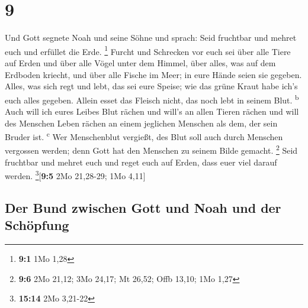 \hypertarget{section-8}{%
\section{9}\label{section-8}}

 Und Gott segnete Noah und seine Söhne und sprach: Seid
fruchtbar und mehret euch und erfüllet die Erde. \footnote{\textbf{9:1}
  1Mo 1,28}  Furcht und Schrecken vor euch sei über alle
Tiere auf Erden und über alle Vögel unter dem Himmel, über alles, was
auf dem Erdboden kriecht, und über alle Fische im Meer; in eure Hände
seien sie gegeben.  Alles, was sich regt und lebt, das sei
eure Speise; wie das grüne Kraut habe ich's euch alles gegeben.
 Allein esset das Fleisch nicht, das noch lebt in seinem
Blut. \textsuperscript{b}  Auch will ich eures Leibes Blut
rächen und will's an allen Tieren rächen und will des Menschen Leben
rächen an einem jeglichen Menschen als dem, der sein Bruder ist.
\textsuperscript{c}  Wer Menschenblut vergießt, des Blut
soll auch durch Menschen vergossen werden; denn Gott hat den Menschen zu
seinem Bilde gemacht. \footnote{\textbf{9:6} 2Mo 21,12; 3Mo 24,17; Mt
  26,52; Offb 13,10; 1Mo 1,27}  Seid fruchtbar und mehret
euch und reget euch auf Erden, dass euer viel darauf werden.
\footnote{\textbf{15:14} 2Mo 3,21-22}{[}\textbf{9:5} 2Mo 21,28-29; 1Mo
4,11{]}

\hypertarget{der-bund-zwischen-gott-und-noah-und-der-schuxf6pfung}{%
\subsection{Der Bund zwischen Gott und Noah und der
Schöpfung}\label{der-bund-zwischen-gott-und-noah-und-der-schuxf6pfung}}

